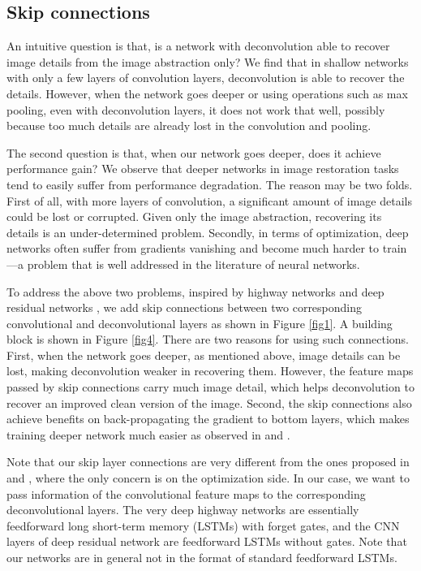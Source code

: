 \subsection{Skip connections}

An intuitive question is that, is a network with deconvolution able to recover image details from
the image abstraction only? We find that in shallow networks with only a few layers
of convolution layers, deconvolution is able to recover the details. However, when the
network goes deeper or using operations such as max pooling, even with deconvolution layers, it does not work
that well, possibly because too much details are already lost in the convolution and pooling.


The second question is that, when our network goes deeper, does it achieve performance gain?
We observe that deeper networks in image restoration tasks tend to easily suffer from
performance degradation. The reason may be two folds. First of all, with more layers of
convolution, a significant amount of image details could be lost or corrupted. Given only the image abstraction,
recovering its details is an under-determined problem. Secondly, in terms of optimization,
deep networks often suffer from gradients vanishing and become much harder to train---a problem
that is well addressed in the literature of neural networks.


To address the above two problems, inspired by highway networks \cite{DBLP:journals/corr/SrivastavaGS15}
and deep residual networks \cite{DBLP:journals/corr/HeZRS15}, we add skip connections between
two corresponding convolutional and deconvolutional layers as shown in Figure \ref{fig1}.
A building block is shown in Figure \ref{fig4}. There are two reasons for using such connections.
First, when the network goes deeper, as mentioned above, image details can be lost, making deconvolution
weaker in recovering them. However, the feature maps passed by skip connections carry much image detail,
which helps deconvolution to recover an improved clean version of the image. Second, the skip connections also achieve
benefits on back-propagating the gradient to bottom layers, which makes training deeper network much
easier as observed in \cite{DBLP:journals/corr/SrivastavaGS15} and \cite{DBLP:journals/corr/HeZRS15}.

Note that our skip layer connections are very different from the ones proposed in
\cite{DBLP:journals/corr/SrivastavaGS15} and \cite{DBLP:journals/corr/HeZRS15}, where the only concern
is on the optimization side. In our case, we want to pass information of the convolutional feature maps
to the corresponding deconvolutional layers. The very deep highway networks
\cite{DBLP:journals/corr/SrivastavaGS15} are essentially feedforward long short-term memory (LSTMs)
with forget gates, and the CNN layers of deep residual network \cite{DBLP:journals/corr/HeZRS15}
are feedforward LSTMs without gates. Note that our networks are in general not in the format of
standard feedforward LSTMs.

